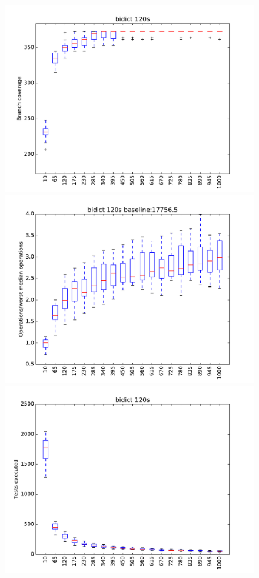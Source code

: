 \begin{figure}
\end{figure}

\begin{figure}
\includegraphics[width=\columnwidth]{graphs/bidictrand120}
\includegraphics[width=\columnwidth]{graphs/opsbidictrand120}
\includegraphics[width=\columnwidth]{graphs/execbidictrand120}
\end{figure}


